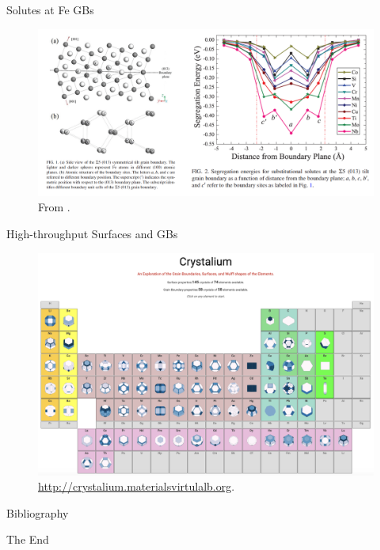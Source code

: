 \documentclass[aspectratio=169]{beamer}
\begin{document}
    \begin{frame}{Solutes at Fe GBs}
        \begin{figure}
            \centering
            \includegraphics[width=0.8\linewidth]{lectures/figures/11_Solutes_at_Fe_GBs.png}
            \caption{From \cite{jinStudyInteractionSolutes2014}.}
        \end{figure}
    \end{frame}


    \begin{frame}{High-throughput Surfaces and GBs}
        \begin{figure}
            \centering
            \includegraphics[width=0.5\linewidth]{lectures/figures/11_Crystalium.png}
            \caption{\url{http://crystalium.materialsvirtulalb.org}.\cite{tranSurfaceEnergiesElemental2016,tranAnisotropicWorkFunction2019,zhengGrainBoundaryProperties2020}}
        \end{figure}
    \end{frame}

    \begin{frame}[allowframebreaks]{Bibliography}
        
        
    \end{frame}



    \begin{frame}
        \Huge{\centerline{The End}}
    \end{frame}
\end{document}
